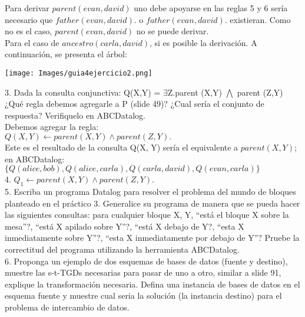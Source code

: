 Para derivar $parent(evan, david)$ uno debe apoyarse en las reglas 5 y 6 sería necesario que $father(evan, david).$ o $father(evan, david).$ existieran. Como no es el caso, $parent(evan, david)$ no se puede derivar. \\

Para el caso de $ancestro(carla, david)$, si es posible la derivación. A continuación, se presenta el árbol: \\

\begin{center}
	\texttt{[image: Images/guia4ejercicio2.png]}
	\label{fig:overview}
\end{center}



3. Dada la consulta conjunctiva: Q(X,Y) = $\exists$Z.parent (X,Y) $\bigwedge$ parent (Z,Y) ¿Qué regla debemos agregarle a P (slide 49)? ¿Cual sería el conjunto de respuesta? Verifiquelo en ABCDatalog.\\

Debemos agregar la regla:\\

$Q(X, Y) \gets parent(X, Y) \land parent(Z, Y).$\\

Este es el resultado de la consulta Q(X, Y) sería el equivalente a $parent(X, Y)$; en ABCDatalog: \\

$\{Q(alice, bob), Q(alice, carla), Q(carla, david), Q(evan, carla)\}$ \\

4. $Q_{1} \gets parent(X, Y) \land parent(Z, Y).$\\



5. Escriba un programa Datalog para resolver el problema del mundo de bloques planteado en el práctico 3. Generalice su programa de manera que se pueda hacer las siguientes consultas: para cualquier bloque X, Y, “está el bloque X sobre la mesa”?, “está X apilado sobre Y”?, “está X debajo de Y?, “esta X inmediatamente sobre Y”?, “esta X inmediatamente por debajo de Y”? Pruebe la correctitud del programa utilizando la herramienta ABCDatalog. \\

6. Proponga un ejemplo de dos esquemas de bases de datos (fuente y destino), muestre las s-t-TGDs necesarias para pasar de uno a otro, similar a slide 91, explique la transformación necesaria. Defina una instancia de bases de datos en el esquema fuente y muestre cual seria la solución (la instancia destino) para el problema de intercambio de datos. \\

\bigskip